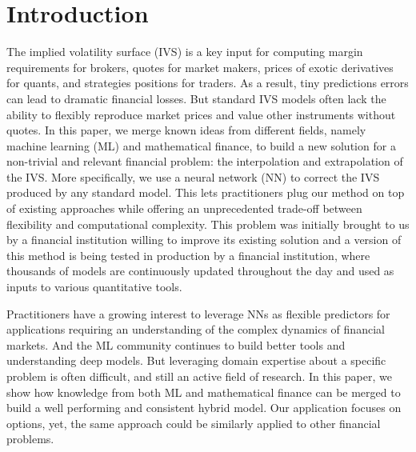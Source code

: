 
\section{Introduction}

The implied volatility surface (IVS) is a key input for computing margin requirements for brokers, quotes for market makers, prices of exotic derivatives for quants, and strategies positions for traders.
As a result, tiny predictions errors can lead to dramatic financial losses.
But standard IVS models often lack the ability to flexibly reproduce market prices and value other instruments without quotes. 
In this paper, we merge known ideas from different fields, namely machine learning (ML) and mathematical finance, to build a new solution for a non-trivial and relevant financial problem: the interpolation and extrapolation of the IVS.
More specifically, we use a neural network (NN) to correct the IVS produced by any standard model.
This lets practitioners plug our method on top of existing approaches while offering an unprecedented trade-off between flexibility and computational complexity.
This problem was initially brought to us by a financial institution willing to improve its existing solution and a version of this method is being tested in production by a financial institution, where thousands of models are continuously updated throughout the day and used as inputs to various quantitative tools.

Practitioners have a growing interest to leverage NNs as flexible predictors for applications requiring an understanding of the complex dynamics of financial markets. 
And the ML community continues to build better tools and understanding deep models.
But leveraging domain expertise about a specific problem is often difficult, and still an active field of research.
In this paper, we show how knowledge from both ML and mathematical finance can be merged to build a well performing and consistent hybrid model.
Our application focuses on options, yet, the same approach could be similarly applied to other financial problems.

